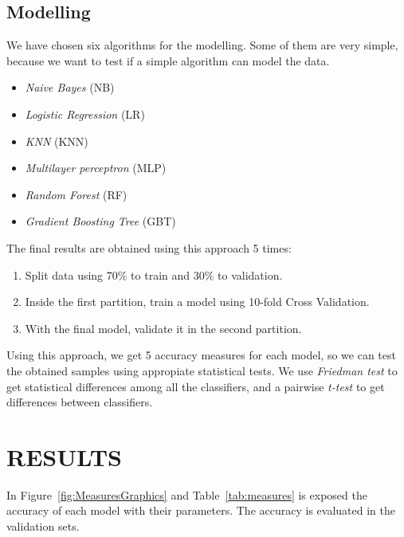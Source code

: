 \documentclass[a4paper,twoside]{article}\usepackage[]{graphicx}\usepackage[]{color}
\begin{document}

\subsection{Modelling}
\label{subsec:modelling}

We have chosen six algorithms for the modelling. Some of them are very simple,
because we want to test if a simple algorithm can model the data.

\begin{itemize}
  \item \emph{Naive Bayes} (NB)
  \item \emph{Logistic Regression} (LR)
  \item \emph{KNN} (KNN)
  \item \emph{Multilayer perceptron} (MLP)
  \item \emph{Random Forest} (RF)
  \item \emph{Gradient Boosting Tree} (GBT)
\end{itemize}

The final results are obtained using this approach 5 times:

\begin{enumerate}
  \item Split data using 70\% to train and 30\% to validation.
  \item Inside the first partition, train a model using 10-fold Cross Validation.
  \item With the final model, validate it in the second partition.
\end{enumerate}

Using this approach, we get 5 accuracy measures for each model, so we can test
the obtained samples using appropiate statistical tests. We use \emph{Friedman
test} to get statistical differences among all the classifiers, and a
pairwise \emph{t-test} to get differences between classifiers.

\section{\uppercase{Results}}
\label{sec:results}

In Figure~\ref{fig:MeasuresGraphics} and Table~\ref{tab:measures} is
exposed the accuracy of each model with their parameters. The accuracy is
evaluated in the validation sets.
\end{document}
